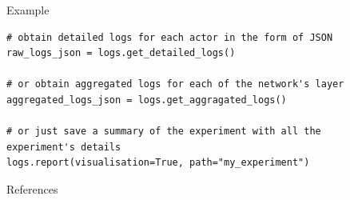 \documentclass[final]{beamer}
\newlength{\sepwidth}
\newlength{\colwidth}
\newcommand{\separatorcolumn}{\begin{column}{\sepwidth}\end{column}}
\begin{document}
\begin{frame}[t, fragile]
\begin{columns}[t]
\begin{column}{\colwidth}
\begin{alertblock}{Example}
\begin{lstlisting}[style=py, basicstyle=\footnotesize\ttfamily]
# obtain detailed logs for each actor in the form of JSON
raw_logs_json = logs.get_detailed_logs()

# or obtain aggregated logs for each of the network's layer
aggregated_logs_json = logs.get_aggragated_logs()

# or just save a summary of the experiment with all the experiment's details
logs.report(visualisation=True, path="my_experiment")
\end{lstlisting}











\end{alertblock}

\begin{block}{References}
    \printbibliography
\end{block}

\end{column}
\separatorcolumn

\end{columns}
\end{frame}
\end{document}
